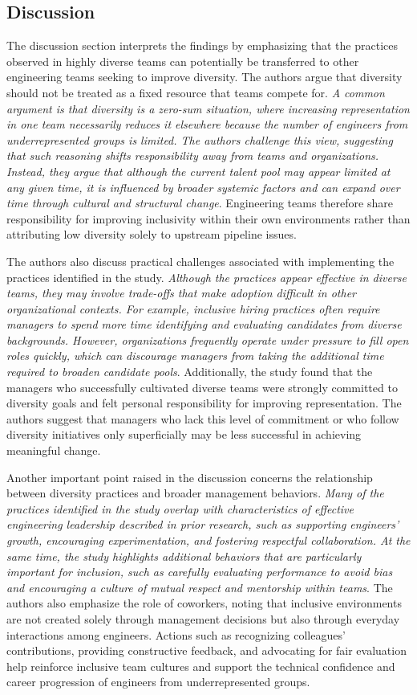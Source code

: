 \subsection{Discussion}
The discussion section interprets the findings by emphasizing that the practices observed in highly diverse teams can potentially be transferred to other engineering teams seeking to improve diversity. The authors argue that diversity should not be treated as a fixed resource that teams compete for. \textit{A common argument is that diversity is a zero-sum situation, where increasing representation in one team necessarily reduces it elsewhere because the number of engineers from underrepresented groups is limited. The authors challenge this view, suggesting that such reasoning shifts responsibility away from teams and organizations. Instead, they argue that although the current talent pool may appear limited at any given time, it is influenced by broader systemic factors and can expand over time through cultural and structural change}. Engineering teams therefore share responsibility for improving inclusivity within their own environments rather than attributing low diversity solely to upstream pipeline issues.

The authors also discuss practical challenges associated with implementing the practices identified in the study. \textit{Although the practices appear effective in diverse teams, they may involve trade-offs that make adoption difficult in other organizational contexts. For example, inclusive hiring practices often require managers to spend more time identifying and evaluating candidates from diverse backgrounds. However, organizations frequently operate under pressure to fill open roles quickly, which can discourage managers from taking the additional time required to broaden candidate pools}. Additionally, the study found that the managers who successfully cultivated diverse teams were strongly committed to diversity goals and felt personal responsibility for improving representation. The authors suggest that managers who lack this level of commitment or who follow diversity initiatives only superficially may be less successful in achieving meaningful change.

Another important point raised in the discussion concerns the relationship between diversity practices and broader management behaviors. \textit{Many of the practices identified in the study overlap with characteristics of effective engineering leadership described in prior research, such as supporting engineers' growth, encouraging experimentation, and fostering respectful collaboration. At the same time, the study highlights additional behaviors that are particularly important for inclusion, such as carefully evaluating performance to avoid bias and encouraging a culture of mutual respect and mentorship within teams}. The authors also emphasize the role of coworkers, noting that inclusive environments are not created solely through management decisions but also through everyday interactions among engineers. Actions such as recognizing colleagues' contributions, providing constructive feedback, and advocating for fair evaluation help reinforce inclusive team cultures and support the technical confidence and career progression of engineers from underrepresented groups.

